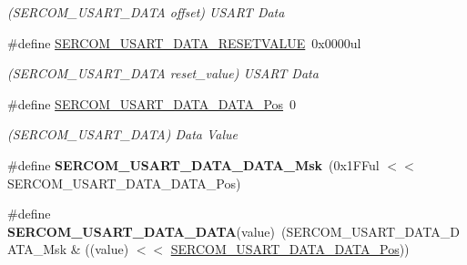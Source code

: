 \begin{DoxyCompactItemize}
\begin{DoxyCompactList}\small\item\em (S\+E\+R\+C\+O\+M\+\_\+\+U\+S\+A\+R\+T\+\_\+\+D\+A\+T\+A offset) U\+S\+A\+R\+T Data \end{DoxyCompactList}\item 
\hypertarget{group___s_a_m_l21___s_e_r_c_o_m_ga21116d7d356af5eb091565415335bf0e}{}\#define \hyperlink{group___s_a_m_l21___s_e_r_c_o_m_ga21116d7d356af5eb091565415335bf0e}{S\+E\+R\+C\+O\+M\+\_\+\+U\+S\+A\+R\+T\+\_\+\+D\+A\+T\+A\+\_\+\+R\+E\+S\+E\+T\+V\+A\+L\+U\+E}~0x0000ul\label{group___s_a_m_l21___s_e_r_c_o_m_ga21116d7d356af5eb091565415335bf0e}

\begin{DoxyCompactList}\small\item\em (S\+E\+R\+C\+O\+M\+\_\+\+U\+S\+A\+R\+T\+\_\+\+D\+A\+T\+A reset\+\_\+value) U\+S\+A\+R\+T Data \end{DoxyCompactList}\item 
\hypertarget{group___s_a_m_l21___s_e_r_c_o_m_ga59582f5f0a9857f58a371c3ddc943e3d}{}\#define \hyperlink{group___s_a_m_l21___s_e_r_c_o_m_ga59582f5f0a9857f58a371c3ddc943e3d}{S\+E\+R\+C\+O\+M\+\_\+\+U\+S\+A\+R\+T\+\_\+\+D\+A\+T\+A\+\_\+\+D\+A\+T\+A\+\_\+\+Pos}~0\label{group___s_a_m_l21___s_e_r_c_o_m_ga59582f5f0a9857f58a371c3ddc943e3d}

\begin{DoxyCompactList}\small\item\em (S\+E\+R\+C\+O\+M\+\_\+\+U\+S\+A\+R\+T\+\_\+\+D\+A\+T\+A) Data Value \end{DoxyCompactList}\item 
\hypertarget{group___s_a_m_l21___s_e_r_c_o_m_gaeb9b3e8af4b0765e1822c9049e10bf8a}{}\#define {\bfseries S\+E\+R\+C\+O\+M\+\_\+\+U\+S\+A\+R\+T\+\_\+\+D\+A\+T\+A\+\_\+\+D\+A\+T\+A\+\_\+\+Msk}~(0x1\+F\+Ful $<$$<$ S\+E\+R\+C\+O\+M\+\_\+\+U\+S\+A\+R\+T\+\_\+\+D\+A\+T\+A\+\_\+\+D\+A\+T\+A\+\_\+\+Pos)\label{group___s_a_m_l21___s_e_r_c_o_m_gaeb9b3e8af4b0765e1822c9049e10bf8a}

\item 
\hypertarget{group___s_a_m_l21___s_e_r_c_o_m_gaeeb796c963c7b31f39be527ab9e65749}{}\#define {\bfseries S\+E\+R\+C\+O\+M\+\_\+\+U\+S\+A\+R\+T\+\_\+\+D\+A\+T\+A\+\_\+\+D\+A\+T\+A}(value)~(S\+E\+R\+C\+O\+M\+\_\+\+U\+S\+A\+R\+T\+\_\+\+D\+A\+T\+A\+\_\+\+D\+A\+T\+A\+\_\+\+Msk \& ((value) $<$$<$ \hyperlink{group___s_a_m_l21___s_e_r_c_o_m_ga59582f5f0a9857f58a371c3ddc943e3d}{S\+E\+R\+C\+O\+M\+\_\+\+U\+S\+A\+R\+T\+\_\+\+D\+A\+T\+A\+\_\+\+D\+A\+T\+A\+\_\+\+Pos}))\label{group___s_a_m_l21___s_e_r_c_o_m_gaeeb796c963c7b31f39be527ab9e65749}


\end{DoxyCompactItemize}
